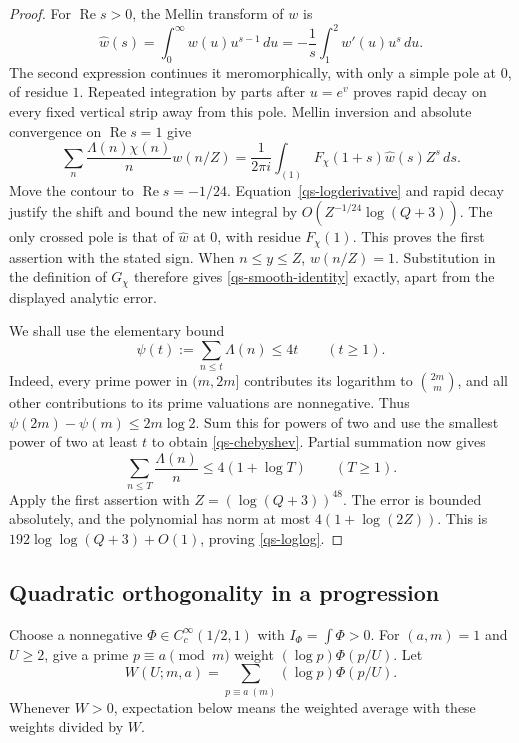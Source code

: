 \begin{proof}
For $\operatorname{Re}s>0$, the Mellin transform of $w$ is
\[
 \widehat w(s)=\int_0^\infty w(u)u^{s-1}\,du
       =-\frac1s\int_1^2 w'(u)u^s\,du.
\]
The second expression continues it meromorphically, with only a
simple pole at $0$, of residue $1$. Repeated integration by parts
after $u=e^v$ proves rapid decay on every fixed vertical strip away
from this pole. Mellin inversion and absolute convergence on
$\operatorname{Re}s=1$ give
\[
 \sum_n\frac{\Lambda(n)\chi(n)}n w(n/Z)
 =\frac1{2\pi i}\int_{(1)}F_\chi(1+s)\widehat w(s)Z^s\,ds.
\]
Move the contour to $\operatorname{Re}s=-1/24$.
Equation~\eqref{qs-logderivative} and rapid decay justify the shift
and bound the new integral by $O(Z^{-1/24}\log(Q+3))$.
The only crossed pole is that of $\widehat w$ at $0$, with residue
$F_\chi(1)$. This proves the first assertion with the stated sign.
When $n\le y\le Z$, $w(n/Z)=1$. Substitution in the definition
of $G_\chi$ therefore gives \eqref{qs-smooth-identity} exactly,
apart from the displayed analytic error.

We shall use the elementary bound
\begin{equation}\label{qs-chebyshev}
 \psi(t):=\sum_{n\le t}\Lambda(n)\le4t\qquad(t\ge1).
\end{equation}
Indeed, every prime power in $(m,2m]$ contributes its logarithm
to $\binom{2m}{m}$, and all other contributions to its prime
valuations are nonnegative. Thus
$\psi(2m)-\psi(m)\le2m\log2$.
Sum this for powers of two and use the smallest power of two
at least $t$ to obtain \eqref{qs-chebyshev}.
Partial summation now gives
\[
 \sum_{n\le T}\frac{\Lambda(n)}n\le4(1+\log T)
       \qquad(T\ge1).
\]
Apply the first assertion with $Z=(\log(Q+3))^{48}$.
The error is bounded absolutely, and the polynomial has norm at
most $4(1+\log(2Z))$. This is
$192\log\log(Q+3)+O(1)$, proving \eqref{qs-loglog}.
\end{proof}

\subsection{Quadratic orthogonality in a progression}

Choose a nonnegative $\Phi\in C_c^\infty(1/2,1)$ with
$I_\Phi=\int\Phi>0$. For $(a,m)=1$ and $U\ge2$, give a prime
$p\equiv a\pmod m$ weight $(\log p)\Phi(p/U)$. Let
\[
 W(U;m,a)=\sum_{p\equiv a\ (m)}(\log p)\Phi(p/U).
\]
Whenever $W>0$, expectation below means the weighted average with
these weights divided by $W$.

